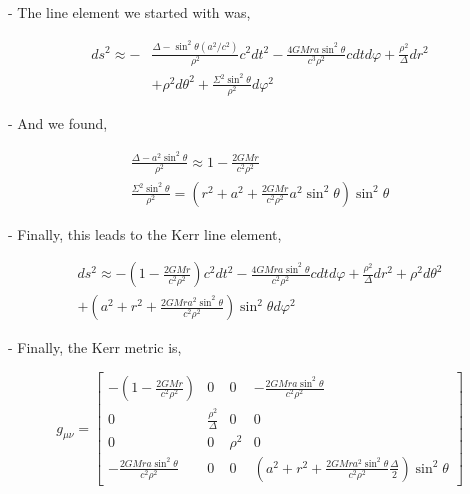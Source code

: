 - The line element we started with was,


\begin{align}
    d s^2 \approx- & \frac{\Delta-\sin ^2 \theta\left(a^2 / c^2\right)}{\rho^2} c^2 d t^2-\frac{4 G M r a \sin ^2 \theta}{c^3 \rho^2} c d t d \varphi+\frac{\rho^2}{\Delta} d r^2 \\
                   & +\rho^2 d \theta^2+\frac{\Sigma^2 \sin ^2 \theta}{\rho^2} d \varphi^2
\end{align}


- And we found,

$$
    \begin{array}{l}
        \frac{\Delta-a^2 \sin ^2 \theta}{\rho^2} \approx 1-\frac{2 G M r}{c^2 \rho^2} \\
        \frac{\Sigma^2 \sin ^2 \theta}{\rho^2}=\left(r^2+a^2+\frac{2 G M r}{c^2 \rho^2} a^2 \sin ^2 \theta\right) \sin ^2 \theta
    \end{array}
$$

- Finally, this leads to the Kerr line element,

$$
    \begin{array}{l}
        d s^2 \approx-\left(1-\frac{2 G M r}{c^2 \rho^2}\right) c^2 d t^2-\frac{4 G M r a \sin ^2 \theta}{c^2 \rho^2} c d t d \varphi+\frac{\rho^2}{\Delta} d r^2+\rho^2 d \theta^2 \\
        +\left(a^2+r^2+\frac{2 G M r a^2 \sin ^2 \theta}{c^2 \rho^2}\right) \sin ^2 \theta d \varphi^2
    \end{array}
$$

- Finally, the Kerr metric is,

$$
    g_{\mu \nu}=\left[\begin{array}{cccc}
            -\left(1-\frac{2 G M r}{c^2 \rho^2}\right)   & 0                     & 0      & -\frac{2 G M r a \sin ^2 \theta}{c^2 \rho^2}                                                       \\
            0                                            & \frac{\rho^2}{\Delta} & 0      & 0                                                                                                  \\
            0                                            & 0                     & \rho^2 & 0                                                                                                  \\
            -\frac{2 G M r a \sin ^2 \theta}{c^2 \rho^2} & 0                     & 0      & \left(a^2+r^2+\frac{2 G M r a^2 \sin ^2 \theta}{c^2 \rho^2} \frac{\Delta}{2}\right) \sin ^2 \theta
        \end{array}\right]
$$


